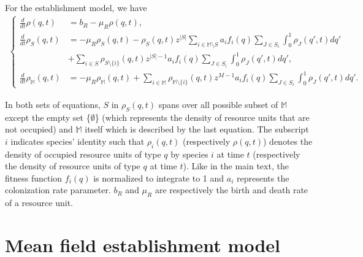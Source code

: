 \documentclass[8pt,a4paper]{article}
\begin{document}
For the establishment model, we have
\begin{eqnarray*}
\begin{cases}
\displaystyle{\frac{d}{dt}}\rho(q,t) &= b_R-\mu_R \rho(q,t), \\
\displaystyle{\frac{d}{dt}}\rho_{S}(q,t) &= -\mu_R \rho_S(q,t) -\rho_S(q,t)z^{|S|} \sum_{i \in \mathbb{M} \setminus S} a_i f_i(q) \sum_{J \in S_i} \int_0^1 \rho_J(q',t) dq' \\
& + \sum_{i \in S} \rho_{S \setminus{\{i\}}}(q,t) z^{|S|-1} a_i f_i(q) \sum_{J \in S_i} \int_0^1 \rho_J(q',t) dq', \\
\displaystyle{\frac{d}{dt}} \rho_{\mathbb{M}}(q,t) &= - \mu_R \rho_{\mathbb{M}}(q,t) + \sum_{i \in \mathbb{M}} \rho_{\mathbb{M} \setminus{\{i\}}}(q,t) z^{M-1} a_i f_i(q) \sum_{J \in S_i} \int_0^1 \rho_J(q',t) dq'.
\end{cases}
\end{eqnarray*}

In both sets of equations, $S$ in $\rho_S(q,t)$ spans over all possible subset of $\mathbb{M}$ except the empty set \{$\emptyset$\} (which represents the density of resource units that are not occupied) and $\mathbb{M}$  itself which is described by the last equation. The subscript $i$ indicates species' identity such that
$ \rho_i (q,t)$ (respectively $\rho(q,t)$) denotes the density of occupied resource units of type $q$ by species $i$ at time $t$ (respectively the density of resource units of type $q$ at time $t$).
Like in the main text, the fitness function $f_i(q)$ is normalized to integrate to 1 and $a_i $  represents the colonization rate parameter. $b_R$ and $\mu_R$ are respectively the birth and death rate of a resource unit. 


\section{Mean field establishment model}
\end{document}
